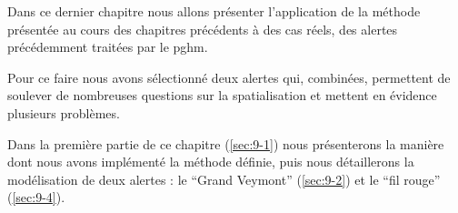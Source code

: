 Dans ce dernier chapitre nous allons présenter l'application de la
méthode présentée au cours des chapitres précédents à des cas réels,
des alertes précédemment traitées par le \ac{pghm}.

Pour ce faire nous avons sélectionné deux alertes qui, combinées,
permettent de soulever de nombreuses questions sur la spatialisation
et mettent en évidence plusieurs problèmes.

Dans la première partie de ce chapitre (\autoref{sec:9-1}) nous
présenterons la manière dont nous avons implémenté la méthode définie,
puis nous détaillerons la modélisation de deux alertes : le
\enquote{Grand Veymont} (\autoref{sec:9-2}) et le \enquote{fil rouge}
(\autoref{sec:9-4}).

